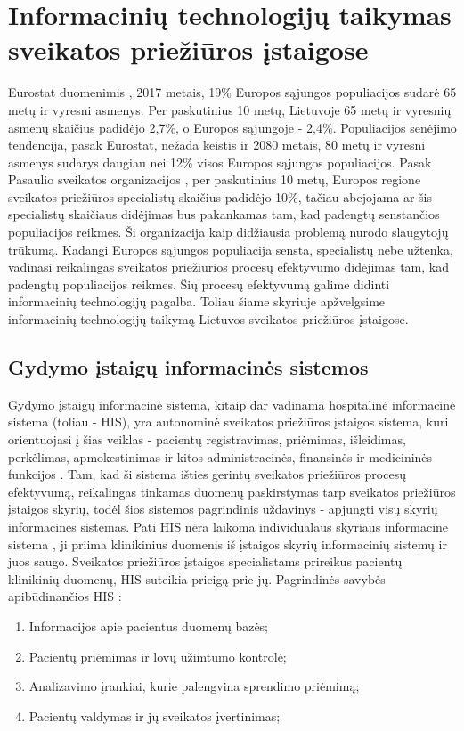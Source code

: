 \section{Informacinių technologijų taikymas sveikatos priežiūros įstaigose}
Eurostat duomenimis \cite{Eurostat}, 2017 metais, 19\% Europos sąjungos populiacijos sudarė 65 metų ir vyresni asmenys. Per paskutinius 10 metų, Lietuvoje 65 metų ir vyresnių asmenų skaičius padidėjo 2,7\%, o Europos sąjungoje - 2,4\%. Populiacijos senėjimo tendencija, pasak Eurostat, nežada keistis ir 2080 metais, 80 metų ir vyresni asmenys sudarys daugiau nei 12\% visos Europos sąjungos populiacijos. Pasak Pasaulio sveikatos organizacijos \cite{Organization2012}, per paskutinius 10 metų, Europos regione sveikatos priežiūros specialistų skaičius padidėjo 10\%, tačiau abejojama ar šis specialistų skaičiaus didėjimas bus pakankamas tam, kad padengtų senstančios populiacijos reikmes. Ši organizacija kaip didžiausia problemą nurodo slaugytojų trūkumą. Kadangi Europos sąjungos populiacija sensta, specialistų nebe užtenka, vadinasi reikalingas sveikatos priežiūrios procesų efektyvumo didėjimas tam, kad padengtų populiacijos reikmes. Šių procesų efektyvumą galime didinti informacinių technologijų pagalba. Toliau šiame skyriuje apžvelgsime informacinių technologijų taikymą Lietuvos sveikatos priežiūros įstaigose.

\subsection{Gydymo įstaigų informacinės sistemos}
Gydymo įstaigų informacinė sistema, kitaip dar vadinama hospitalinė informacinė sistema (toliau - HIS), yra autonominė sveikatos priežiūros įstaigos sistema, kuri orientuojasi į šias veiklas - pacientų registravimas, priėmimas, išleidimas, perkėlimas, apmokestinimas ir kitos administracinės, finansinės ir medicininės funkcijos \cite{Sabooniha2012}. Tam, kad ši sistema išties gerintų sveikatos priežiūros procesų efektyvumą, reikalingas tinkamas duomenų paskirstymas tarp sveikatos priežiūros įstaigos skyrių, todėl šios sistemos pagrindinis uždavinys - apjungti visų skyrių informacines sistemas. Pati HIS nėra laikoma individualaus skyriaus informacine sistema \cite{JuliusGriskevicius}, ji priima klinikinius duomenis iš įstaigos skyrių informacinių sistemų ir juos saugo. Sveikatos priežiūros įstaigos specialistams prireikus pacientų klinikinių duomenų, HIS suteikia prieigą prie jų. Pagrindinės savybės apibūdinančios HIS \cite{JuliusGriskevicius}: 
\begin{enumerate}
    \item Informacijos apie pacientus duomenų bazės;
    \item Pacientų priėmimas ir lovų užimtumo kontrolė;
    \item Analizavimo įrankiai, kurie palengvina sprendimo priėmimą;
    \item Pacientų valdymas ir jų sveikatos įvertinimas;
\end{enumerate}


